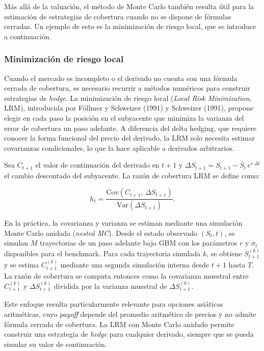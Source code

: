\documentclass[11pt,a4paper,spanish]{article}
\numberwithin{equation}{section} %
\begin{document}
Más allá de la valuación, el método de Monte Carlo también resulta útil para la estimación de estrategias de cobertura cuando no se dispone de fórmulas cerradas. Un ejemplo de esto es la minimización de riesgo local, que se introduce a continuación.

\subsubsection{Minimización de riesgo local}\label{subsec:lrm}

Cuando el mercado es incompleto o el derivado no cuenta con una fórmula cerrada de cobertura, es necesario recurrir a métodos numéricos para construir estrategias de \textit{hedge}. La minimización de riesgo local (\textit{Local Risk Minimization}, LRM), introducida por Föllmer y Schweizer (1991) y Schweizer (1991), propone elegir en cada paso la posición en el subyacente que minimiza la varianza del error de cobertura un paso adelante. A diferencia del delta hedging, que requiere conocer la forma funcional del precio del derivado, la LRM solo necesita estimar covarianzas condicionales, lo que la hace aplicable a derivados arbitrarios.

Sea $C_{t+1}$ el valor de continuación del derivado en $t+1$ y $\Delta S_{t+1} = S_{t+1} - S_t\, e^{r\,\Delta t}$ el cambio descontado del subyacente. La razón de cobertura LRM se define como:

\begin{equation}
h_t = \frac{\text{Cov}(C_{t+1},\, \Delta S_{t+1})}{\text{Var}(\Delta S_{t+1})}.
\label{eq:lrm}
\end{equation}

En la práctica, la covarianza y varianza se estiman mediante una simulación Monte Carlo anidada (\textit{nested MC}). Desde el estado observado $(S_t, t)$, se simulan $M$ trayectorias de un paso adelante bajo GBM con los parámetros $r$ y $\sigma_t$ disponibles para el benchmark. Para cada trayectoria simulada $k$, se obtiene $S_{t+1}^{(k)}$ y se estima $C_{t+1}^{(k)}$ mediante una segunda simulación interna desde $t+1$ hasta $T$. La razón de cobertura se computa entonces como la covarianza muestral entre $C_{t+1}^{(k)}$ y $\Delta S_{t+1}^{(k)}$ dividida por la varianza muestral de $\Delta S_{t+1}^{(k)}$.

Este enfoque resulta particularmente relevante para opciones asiáticas aritméticas, cuyo \textit{payoff} depende del promedio aritmético de precios y no admite fórmula cerrada de cobertura. La LRM con Monte Carlo anidado permite construir una estrategia de \textit{hedge} para cualquier derivado, siempre que se pueda simular su valor de continuación.
\end{document}
